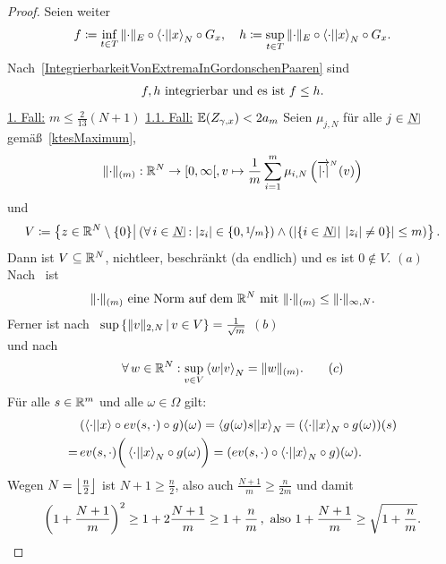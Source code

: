 \begin{proof}
Seien weiter
\[f \coloneqq \inf_{t \in T} \, \lVert\cdot\rVert_E \circ \left\langle \cdot ||x\right\rangle _N \circ G_x,
\quad
h\coloneqq  \sup_{t \in T} \, \lVert\cdot\rVert_E \circ \left\langle \cdot ||x\right\rangle _N \circ G_x\text.\]
Nach~\ref{IntegrierbarkeitVonExtremaInGordonschenPaaren} sind
\begin{align}
f, h\text{ integrierbar und es ist } f \le h\text.\label{svmseq:2}
\end{align}
\underline{1. Fall:} $m \le \frac 2 {13}(N+1)$\absatz
\underline{1.1. Fall:} $\mathbb{E}(Z_{\gamma, x}) < 2a_m$\absatz
Seien $\mu_{j, N}$ für alle $j \in \haken N$ gemäß~\ref{ktesMaximum},
\[\lVert\cdot\rVert_{(m)}:\mathbb{R}^N \rightarrow [0, \infty[, v \mapsto
\frac 1 m \sum_{i=1}^m \mu_{i, N}\left({\overrightarrow{\left|\cdot\right|}}^{{}_N} (v)\right)\]
und
\[ V\coloneqq  \mengea{z \in \R^N\setminus\meng 0}
    {\left(\forall\, i \in \haken N: \abs{z_i} \in\meng{0,\nicefrac 1m} \right)
    \wedge \left(\abs{\menge{i \in \haken N}{\abs{z_i} \neq 0}}\le m \right)}
    \text.\]
Dann ist $V \subseteq \mathbb{R}^N$, nichtleer,
beschränkt (da endlich) und es ist $0 \notin V$. \hfill $(a)$\\
Nach~ ist
\begin{align}
\lVert\cdot\rVert_{(m)}\text{ eine
Norm auf dem }\mathbb{R}^N\text{ mit } 
\lVert\cdot\rVert_{(m)} \le \lVert\cdot\rVert_{\infty, N}\text.\label{svmseq:3}
\end{align}
Ferner ist nach~
$\sup\left\{\lVert v\rVert_{2, N}\,|\,v \in V\right\} = \frac 1{\sqrt m}$ \hfill $(b)$\\
und nach~
\begin{align}
\forall\, w \in \mathbb{R}^N: \sup_{v \in V}\left\langle w |v\right\rangle_N = \lVert w\rVert_{(m)}\text.\tag{$c$}
\end{align}
Für alle $s \in \mathbb{R}^m$ und alle $\omega \in \Omega$ gilt:
\begin{align}
&\,(\left\langle \cdot ||x\right\rangle \circ ev(s, \cdot) \circ g)(\omega)
= \left\langle g(\omega)s ||x\right\rangle_N = (\left\langle \cdot ||x\right\rangle_N \circ g(\omega))(s)\notag\\
=&\, ev(s, \cdot) \bigg(\left\langle \cdot ||x\right\rangle _N \circ g(\omega) \bigg)
= (ev(s, \cdot) \circ \left\langle \cdot ||x\right\rangle _N \circ g)(\omega) \text.\label{svmseq:4}
\end{align}
Wegen $N = \left\lfloor{\frac n 2}\right\rfloor$ ist $N+1\ge \frac n 2$, also auch
$\frac {N+1}m \ge \frac n {2m}$ und damit
\begin{align}\left(1+\frac{N+1}m \right)^2
\ge 1 + 2 \frac{N+1}m \ge 1 + \frac n m\, , \text{ also } 1 + \frac{N+1}m
\ge \sqrt{1+ \frac n m} \text.\label{svmseq:5}\end{align}

\end{proof}
